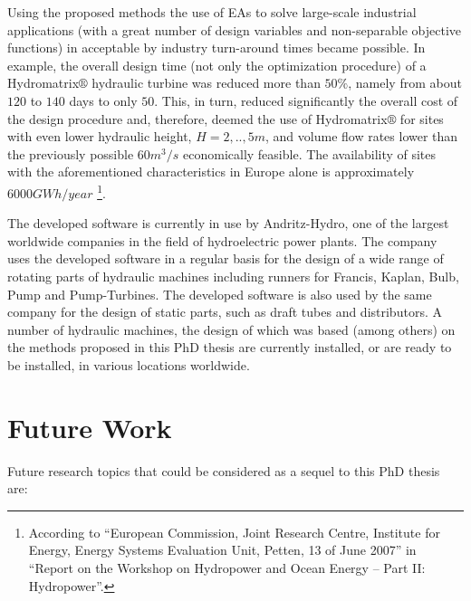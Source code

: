Using the proposed  methods the use of EAs to solve large-scale industrial applications (with a great number of design variables and non-separable objective functions) in acceptable by industry turn-around times became possible. In example, the overall design time (not only the optimization procedure) of a Hydromatrix$\circledR$ hydraulic turbine was reduced more than $50\%$, namely from about $120$ to $140$ days to only $50$. This, in turn, reduced significantly the overall cost of the design procedure and, therefore, deemed the use of Hydromatrix$\circledR$ for sites with even lower hydraulic height, $H=2,..,5m$, and volume flow rates lower than the previously possible $60m^3/s$ economically feasible. The availability of sites with the aforementioned characteristics in Europe alone is approximately $6000GWh/year$ \footnote{According to ``European Commission, Joint Research Centre, Institute for Energy, Energy Systems Evaluation Unit,  Petten, 13 of June 2007'' in  ``Report on the Workshop on Hydropower and Ocean Energy – Part II: Hydropower''.}.

The developed software is currently in use by Andritz-Hydro, one of the largest worldwide companies in the field of hydroelectric power plants. The company uses the developed software in a regular basis for the design of a wide range of rotating parts of hydraulic machines including runners for Francis, Kaplan, Bulb, Pump and Pump-Turbines. The developed software is also used by the same company for the design of static parts, such as draft tubes and distributors. A number of hydraulic machines, the design of which was based (among others) on the methods proposed in this PhD thesis are currently installed, or are ready to be installed,  in various locations worldwide.         


\section{Future Work}

Future research topics that could be considered as a sequel to this PhD thesis are:

